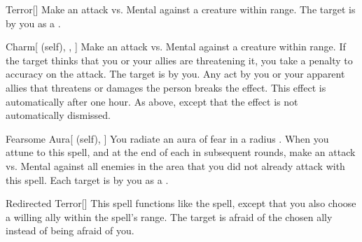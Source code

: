 \lowercase{\hypertarget{spell:Terror}{}}\label{spell:Terror}
\begin{freeability}[\nth{1}]{\hypertarget{spell:Terror}{Terror}}[]
Make an attack vs. Mental against a creature within \rngclose range.
\hit The target is \frightened by you as a .
\end{freeability}
\vspace{0.25em}



\lowercase{\hypertarget{spell:Charm}{}}\label{spell:Charm}
\begin{attuneability}[\nth{2}]{\hypertarget{spell:Charm}{Charm}}[ (self), , ]
Make an attack vs. Mental against a creature within \rnglong range.
If the target thinks that you or your allies are threatening it, you take a  penalty to accuracy on the attack.
\hit The target is \charmed by you.
Any act by you or your apparent allies that threatens or damages the  person breaks the effect.
This effect is automatically  after one hour.
\crit As above, except that the effect is not automatically dismissed.
\end{attuneability}
\vspace{0.25em}



\lowercase{\hypertarget{spell:Fearsome Aura}{}}\label{spell:Fearsome Aura}
\begin{attuneability}[\nth{2}]{\hypertarget{spell:Fearsome Aura}{Fearsome Aura}}[ (self), ]
You radiate an aura of fear in a \areamed radius .
When you attune to this spell, and at the end of each  in subsequent rounds, make an attack vs. Mental against all enemies in the area that you did not already attack with this spell.
\hit Each target is  by you as a .
\end{attuneability}
\vspace{0.25em}



\lowercase{\hypertarget{spell:Redirected Terror}{}}\label{spell:Redirected Terror}
\begin{freeability}[\nth{2}]{\hypertarget{spell:Redirected Terror}{Redirected Terror}}[]
This spell functions like the  spell, except that you also choose a willing ally within the spell's range.
The target is afraid of the chosen ally instead of being afraid of you.
\end{freeability}
\vspace{0.25em}



